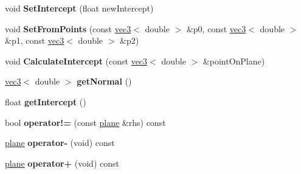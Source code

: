 \begin{DoxyCompactItemize}
\item 
\hypertarget{classmath_1_1plane_a09293a1282b9165ae9fc65dde203472a}{
void {\bfseries SetIntercept} (float newIntercept)}
\label{classmath_1_1plane_a09293a1282b9165ae9fc65dde203472a}

\item 
\hypertarget{classmath_1_1plane_ac503982275c9e6d9d18291e9a9ff0cd3}{
void {\bfseries SetFromPoints} (const \hyperlink{classmath_1_1vec3}{vec3}$<$ double $>$ \&p0, const \hyperlink{classmath_1_1vec3}{vec3}$<$ double $>$ \&p1, const \hyperlink{classmath_1_1vec3}{vec3}$<$ double $>$ \&p2)}
\label{classmath_1_1plane_ac503982275c9e6d9d18291e9a9ff0cd3}

\item 
\hypertarget{classmath_1_1plane_a571118f6e3ae4af82eed83bdb4941704}{
void {\bfseries CalculateIntercept} (const \hyperlink{classmath_1_1vec3}{vec3}$<$ double $>$ \&pointOnPlane)}
\label{classmath_1_1plane_a571118f6e3ae4af82eed83bdb4941704}

\item 
\hypertarget{classmath_1_1plane_a5ef9af94aece772731e1e00ece1002e7}{
\hyperlink{classmath_1_1vec3}{vec3}$<$ double $>$ {\bfseries getNormal} ()}
\label{classmath_1_1plane_a5ef9af94aece772731e1e00ece1002e7}

\item 
\hypertarget{classmath_1_1plane_a2353042f0f0be40568e351449491adeb}{
float {\bfseries getIntercept} ()}
\label{classmath_1_1plane_a2353042f0f0be40568e351449491adeb}

\item 
\hypertarget{classmath_1_1plane_af253279846f5efc0669db9a1b97114d1}{
bool {\bfseries operator!=} (const \hyperlink{classmath_1_1plane}{plane} \&rhs) const }
\label{classmath_1_1plane_af253279846f5efc0669db9a1b97114d1}

\item 
\hypertarget{classmath_1_1plane_a6dcd61c1df10916b96859f81c4bd75ec}{
\hyperlink{classmath_1_1plane}{plane} {\bfseries operator-\/} (void) const }
\label{classmath_1_1plane_a6dcd61c1df10916b96859f81c4bd75ec}

\item 
\hypertarget{classmath_1_1plane_a2397ab977d98ee414158194e4fb34b48}{
\hyperlink{classmath_1_1plane}{plane} {\bfseries operator+} (void) const }
\label{classmath_1_1plane_a2397ab977d98ee414158194e4fb34b48}

\end{DoxyCompactItemize}
